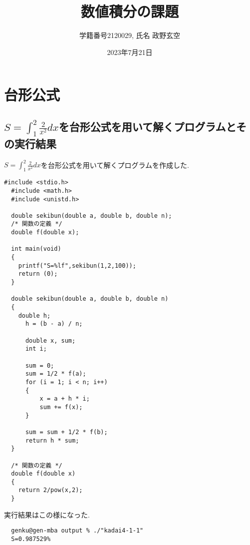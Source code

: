 \documentclass[a4j,10pt,dvipdfmx]{jarticle}
\begin{document}
\title{数値積分の課題}
\author{学籍番号2120029, 氏名 政野玄空}
\date{2023年7月21日}
\maketitle
\section{台形公式}
\subsection{$S=\int_{1}^{2}\frac{2}{x^2}dx$を台形公式を用いて解くプログラムとその実行結果}
$S=\int_{1}^{2}\frac{2}{x^2}dx$を台形公式を用いて解くプログラムを作成した.
\begin{lstlisting}[label=prm1, caption=kadai4-1-1]
  #include <stdio.h>
  #include <math.h>
  #include <unistd.h>
  
  double sekibun(double a, double b, double n);
  /* 関数の定義 */
  double f(double x);
  
  int main(void)
  {
    printf("S=%lf",sekibun(1,2,100));
    return (0);
  }
  
  double sekibun(double a, double b, double n)
  {
    double h;
      h = (b - a) / n;
  
      double x, sum;
      int i;
  
      sum = 0;
      sum = 1/2 * f(a);
      for (i = 1; i < n; i++)
      {
          x = a + h * i;
          sum += f(x);
      }
  
      sum = sum + 1/2 * f(b);
      return h * sum;
  }
  
  /* 関数の定義 */
  double f(double x)
  {
    return 2/pow(x,2);
  }   
\end{lstlisting}
実行結果はこの様になった.
\begin{verbatim}
  genku@gen-mba output % ./"kadai4-1-1"
  S=0.987529%        
\end{verbatim}
\end{document}
